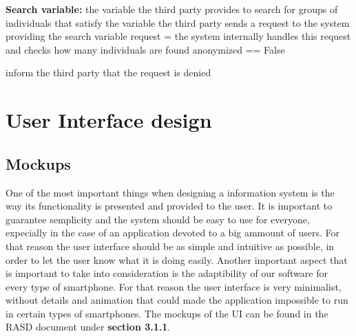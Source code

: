 \documentclass[12pt]{article}
\begin{document}
\begin{algorithm}[H]
 \textbf{Search variable:} the variable the third party provides to search for groups of individuals that satisfy the variable\;
 \vspace{1mm}
 the third party sends a request to the system providing the search variable\;\vspace{1mm}
 request = the system internally handles this request and checks how many individuals are found\;\vspace{1mm}
    {    
    anonymized == False\;   
    }  
 
    {    
    inform the third party that the request is denied\;   
    }  
 \vspace{5mm}
 \caption{Access anonymized Health Data of groups of an Individuals.}
\end{algorithm}

\newpage
\section{User Interface design}

\subsection{Mockups} One of the most important things when designing a information system is the way its functionality is presented and provided to the user. It is important to guarantee semplicity and the system should be easy to use for everyone, expecially in the case of an application devoted to a big ammount of users. For that reason the user interface should be as simple and intuitive as possible, in order to let the user know what it is doing easily. 
    Another important aspect that is important to take into consideration is the adaptibility of our software for every type of smartphone. For that reason the user interface is very minimalist, without details and animation that could made the application impossible to run in certain types of smartphones. The mockups of the UI can be found in the RASD document under \textbf{section 3.1.1}.
    
\end{document}
